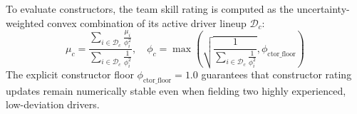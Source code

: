 To evaluate constructors, the team skill rating is computed as the uncertainty-weighted convex combination of its active driver lineup $\mathcal{D}_c$:
\begin{equation}
\mu_c = \frac{\sum_{i \in \mathcal{D}_c} \frac{\mu_i}{\phi_i^2}}{\sum_{i \in \mathcal{D}_c} \frac{1}{\phi_i^2}}, \quad \phi_c = \max\left( \sqrt{\frac{1}{\sum_{i \in \mathcal{D}_c} \frac{1}{\phi_i^2}}}, \phi_{\text{ctor\_floor}} \right)
\label{eq:constructor_rating}
\end{equation}
The explicit constructor floor $\phi_{\text{ctor\_floor}} = 1.0$ guarantees that constructor rating updates remain numerically stable even when fielding two highly experienced, low-deviation drivers.
